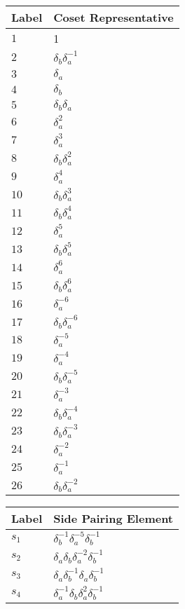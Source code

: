 \documentclass{article}
\begin{document}

\begin{center}
\begin{tabular}{ll}
\toprule
Label & Coset Representative\\
\midrule
$1$ & 1 \\
$2$ & $\delta_b^{}\delta_a^{-1}$ \\
$3$ & $\delta_a^{}$ \\
$4$ & $\delta_b^{}$ \\
$5$ & $\delta_b^{}\delta_a^{}$ \\
$6$ & $\delta_a^{2}$ \\
$7$ & $\delta_a^{3}$ \\
$8$ & $\delta_b^{}\delta_a^{2}$ \\
$9$ & $\delta_a^{4}$ \\
$10$ & $\delta_b^{}\delta_a^{3}$ \\
$11$ & $\delta_b^{}\delta_a^{4}$ \\
$12$ & $\delta_a^{5}$ \\
$13$ & $\delta_b^{}\delta_a^{5}$ \\
$14$ & $\delta_a^{6}$ \\
$15$ & $\delta_b^{}\delta_a^{6}$ \\
$16$ & $\delta_a^{-6}$ \\
$17$ & $\delta_b^{}\delta_a^{-6}$ \\
$18$ & $\delta_a^{-5}$ \\
$19$ & $\delta_a^{-4}$ \\
$20$ & $\delta_b^{}\delta_a^{-5}$ \\
$21$ & $\delta_a^{-3}$ \\
$22$ & $\delta_b^{}\delta_a^{-4}$ \\
$23$ & $\delta_b^{}\delta_a^{-3}$ \\
$24$ & $\delta_a^{-2}$ \\
$25$ & $\delta_a^{-1}$ \\
$26$ & $\delta_b^{}\delta_a^{-2}$ \\
\bottomrule
\end{tabular}
\hfill
\begin{tabular}{ll}
\toprule
Label & Side Pairing Element\\
\midrule
$s_{1}$ & $\delta_b^{-1}\delta_a^{-5}\delta_b^{-1}$ \\
$s_{2}$ & $\delta_a^{}\delta_b^{}\delta_a^{-2}\delta_b^{-1}$ \\
$s_{3}$ & $\delta_a^{}\delta_b^{-1}\delta_a^{}\delta_b^{-1}$ \\
$s_{4}$ & $\delta_a^{-1}\delta_b^{}\delta_a^{2}\delta_b^{-1}$ \\

\end{tabular}
\end{center}
\end{document}
